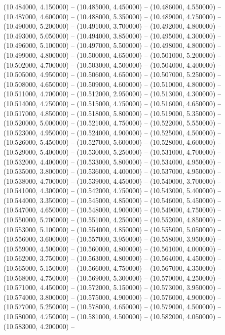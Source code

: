 (10.484000, 4.150000) -- 
(10.485000, 4.450000) -- 
(10.486000, 4.550000) -- 
(10.487000, 4.600000) -- 
(10.488000, 5.350000) -- 
(10.489000, 4.750000) -- 
(10.490000, 5.200000) -- 
(10.491000, 3.700000) -- 
(10.492000, 4.800000) -- 
(10.493000, 5.050000) -- 
(10.494000, 3.850000) -- 
(10.495000, 4.300000) -- 
(10.496000, 5.100000) -- 
(10.497000, 5.500000) -- 
(10.498000, 4.800000) -- 
(10.499000, 4.800000) -- 
(10.500000, 4.650000) -- 
(10.501000, 5.200000) -- 
(10.502000, 4.700000) -- 
(10.503000, 4.500000) -- 
(10.504000, 4.400000) -- 
(10.505000, 4.950000) -- 
(10.506000, 4.650000) -- 
(10.507000, 5.250000) -- 
(10.508000, 4.650000) -- 
(10.509000, 4.600000) -- 
(10.510000, 4.800000) -- 
(10.511000, 4.700000) -- 
(10.512000, 2.950000) -- 
(10.513000, 4.300000) -- 
(10.514000, 4.750000) -- 
(10.515000, 4.750000) -- 
(10.516000, 4.650000) -- 
(10.517000, 4.850000) -- 
(10.518000, 5.800000) -- 
(10.519000, 5.350000) -- 
(10.520000, 5.000000) -- 
(10.521000, 4.750000) -- 
(10.522000, 5.550000) -- 
(10.523000, 4.950000) -- 
(10.524000, 4.900000) -- 
(10.525000, 4.500000) -- 
(10.526000, 5.450000) -- 
(10.527000, 5.600000) -- 
(10.528000, 4.600000) -- 
(10.529000, 5.400000) -- 
(10.530000, 5.250000) -- 
(10.531000, 4.700000) -- 
(10.532000, 4.400000) -- 
(10.533000, 5.800000) -- 
(10.534000, 4.950000) -- 
(10.535000, 3.800000) -- 
(10.536000, 4.400000) -- 
(10.537000, 4.950000) -- 
(10.538000, 4.700000) -- 
(10.539000, 4.450000) -- 
(10.540000, 3.700000) -- 
(10.541000, 4.300000) -- 
(10.542000, 4.750000) -- 
(10.543000, 5.400000) -- 
(10.544000, 3.350000) -- 
(10.545000, 4.850000) -- 
(10.546000, 5.450000) -- 
(10.547000, 4.650000) -- 
(10.548000, 4.900000) -- 
(10.549000, 4.750000) -- 
(10.550000, 5.700000) -- 
(10.551000, 4.250000) -- 
(10.552000, 4.850000) -- 
(10.553000, 5.100000) -- 
(10.554000, 4.850000) -- 
(10.555000, 5.050000) -- 
(10.556000, 3.600000) -- 
(10.557000, 3.950000) -- 
(10.558000, 3.950000) -- 
(10.559000, 4.500000) -- 
(10.560000, 4.800000) -- 
(10.561000, 4.000000) -- 
(10.562000, 3.750000) -- 
(10.563000, 4.800000) -- 
(10.564000, 4.450000) -- 
(10.565000, 5.150000) -- 
(10.566000, 4.750000) -- 
(10.567000, 4.350000) -- 
(10.568000, 4.750000) -- 
(10.569000, 5.300000) -- 
(10.570000, 4.250000) -- 
(10.571000, 4.450000) -- 
(10.572000, 5.150000) -- 
(10.573000, 3.950000) -- 
(10.574000, 3.800000) -- 
(10.575000, 4.900000) -- 
(10.576000, 4.900000) -- 
(10.577000, 5.250000) -- 
(10.578000, 4.650000) -- 
(10.579000, 4.500000) -- 
(10.580000, 4.750000) -- 
(10.581000, 4.500000) -- 
(10.582000, 4.050000) -- 
(10.583000, 4.200000) -- 
